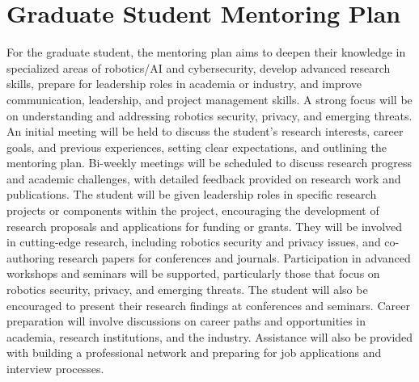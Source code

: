 \section*{Graduate Student Mentoring Plan}
For the graduate student, the mentoring plan aims to deepen their knowledge in specialized areas of robotics/AI and cybersecurity, develop advanced research skills, prepare for leadership roles in academia or industry, and improve communication, leadership, and project management skills. 
A strong focus will be on understanding and addressing robotics security, privacy, and emerging threats.
An initial meeting will be held to discuss the student's research interests, career goals, and previous experiences, setting clear expectations, and outlining the mentoring plan. 
Bi-weekly meetings will be scheduled to discuss research progress and academic challenges, with detailed feedback provided on research work and publications.
The student will be given leadership roles in specific research projects or components within the project, encouraging the development of research proposals and applications for funding or grants. They will be involved in cutting-edge research, including robotics security and privacy issues, and co-authoring research papers for conferences and journals.
Participation in advanced workshops and seminars will be supported, particularly those that focus on robotics security, privacy, and emerging threats. The student will also be encouraged to present their research findings at conferences and seminars. 
Career preparation will involve discussions on career paths and opportunities in academia, research institutions, and the industry. Assistance will also be provided with building a professional network and preparing for job applications and interview processes. 

